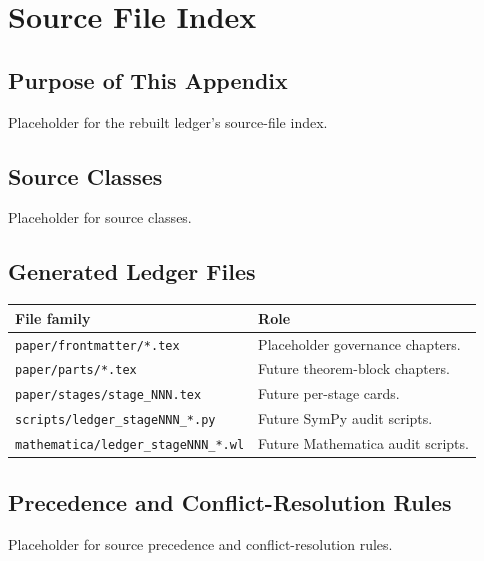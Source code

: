 \chapter{Source File Index}
\label{app:source-file-index}

\providecommand{\SrcFile}[1]{\begingroup\footnotesize\nolinkurl{#1}\endgroup}
\providecommand{\SrcPath}[1]{\begingroup\footnotesize\nolinkurl{#1}\endgroup}

\section{Purpose of This Appendix}
\label{sec:source-index-purpose}

Placeholder for the rebuilt ledger's source-file index.

\section{Source Classes}
\label{sec:source-classes}

Placeholder for source classes.

\section{Generated Ledger Files}
\label{sec:generated-ledger-files}

\begin{longtable}{L{0.35\textwidth}L{0.55\textwidth}}
\toprule
File family & Role \\
\midrule
\endhead
\SrcFile{paper/frontmatter/*.tex} & Placeholder governance chapters. \\
\SrcFile{paper/parts/*.tex} & Future theorem-block chapters. \\
\SrcFile{paper/stages/stage_NNN.tex} & Future per-stage cards. \\
\SrcFile{scripts/ledger_stageNNN_*.py} & Future SymPy audit scripts. \\
\SrcFile{mathematica/ledger_stageNNN_*.wl} & Future Mathematica audit scripts. \\
\bottomrule
\end{longtable}

\section{Precedence and Conflict-Resolution Rules}
\label{sec:source-precedence-rules}

Placeholder for source precedence and conflict-resolution rules.
